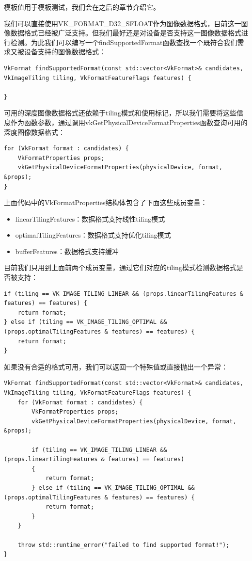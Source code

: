 \documentclass{ctexart}
\begin{document}
模板值用于模板测试，我们会在之后的章节介绍它。

我们可以直接使用VK\_FORMAT\_D32\_SFLOAT作为图像数据格式，目前这一图像数据格式已经被广泛支持。但我们最好还是对设备是否支持这一图像数据格式进行检测。为此我们可以编写一个findSupportedFormat函数查找一个既符合我们需求又被设备支持的图像数据格式：

\begin{lstlisting}[language={[ANSI]C}]
VkFormat findSupportedFormat(const std::vector<VkFormat>& candidates, VkImageTiling tiling, VkFormatFeatureFlags features) {

}
\end{lstlisting}

可用的深度图像数据格式还依赖于tiling模式和使用标记，所以我们需要将这些信息作为函数参数，通过调用vkGetPhysicalDeviceFormatProperties函数查询可用的深度图像数据格式：

\begin{lstlisting}[language={[ANSI]C}]
for (VkFormat format : candidates) {
	VkFormatProperties props;
	vkGetPhysicalDeviceFormatProperties(physicalDevice, format, &props);
}
\end{lstlisting}

上面代码中的VkFormatProperties结构体包含了下面这些成员变量：

\begin{itemize}
	\item linearTilingFeatures：数据格式支持线性tiling模式
	\item optimalTilingFeatures：数据格式支持优化tiling模式
	\item bufferFeatures：数据格式支持缓冲
\end{itemize}

目前我们只用到上面前两个成员变量，通过它们对应的tiling模式检测数据格式是否被支持：

\begin{lstlisting}[language={[ANSI]C}]
if (tiling == VK_IMAGE_TILING_LINEAR && (props.linearTilingFeatures & features) == features) {
	return format;
} else if (tiling == VK_IMAGE_TILING_OPTIMAL && (props.optimalTilingFeatures & features) == features) {
	return format;
}
\end{lstlisting}

如果没有合适的格式可用，我们可以返回一个特殊值或直接抛出一个异常：

\begin{lstlisting}[language={[ANSI]C}]
VkFormat findSupportedFormat(const std::vector<VkFormat>& candidates, VkImageTiling tiling, VkFormatFeatureFlags features) {
	for (VkFormat format : candidates) {
		VkFormatProperties props;
		vkGetPhysicalDeviceFormatProperties(physicalDevice, format, &props);

		if (tiling == VK_IMAGE_TILING_LINEAR && (props.linearTilingFeatures & features) == features)
		{
			return format;
		} else if (tiling == VK_IMAGE_TILING_OPTIMAL && (props.optimalTilingFeatures & features) == features) {
			return format;
		}
	}

	throw std::runtime_error("failed to find supported format!");
}
\end{lstlisting}
\end{document}
